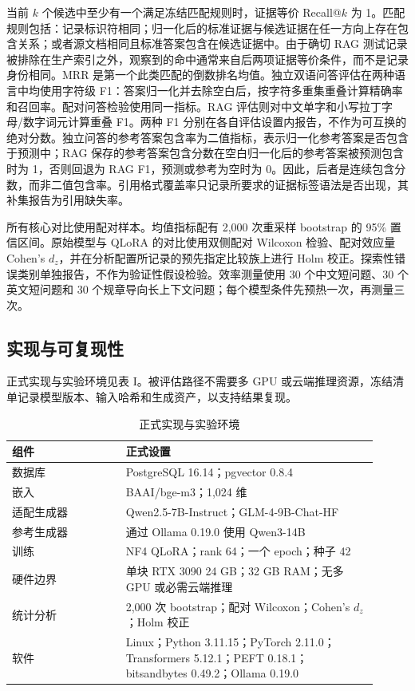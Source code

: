 当前 $k$ 个候选中至少有一个满足冻结匹配规则时，证据等价 Recall@$k$ 为 1。匹配规则包括：记录标识符相同；归一化后的标准证据与候选证据在任一方向上存在包含关系；或者源文档相同且标准答案包含在候选证据中。由于确切 RAG 测试记录被排除在生产索引之外，观察到的命中通常来自后两项证据等价条件，而不是记录身份相同。MRR 是第一个此类匹配的倒数排名均值。独立双语问答评估在两种语言中均使用字符级 F1：答案归一化并去除空白后，按字符多重集重叠计算精确率和召回率。配对问答检验使用同一指标。RAG 评估则对中文单字和小写拉丁字母/数字词元计算重叠 F1。两种 F1 分别在各自评估设置内报告，不作为可互换的绝对分数。独立问答的参考答案包含率为二值指标，表示归一化参考答案是否包含于预测中；RAG 保存的参考答案包含分数在空白归一化后的参考答案被预测包含时为 1，否则回退为 RAG F1，预测或参考为空时为 0。因此，后者是连续包含分数，而非二值包含率。引用格式覆盖率只记录所要求的证据标签语法是否出现，其补集报告为引用缺失率。

所有核心对比使用配对样本。均值指标配有 2,000 次重采样 bootstrap 的 95\% 置信区间。原始模型与 QLoRA 的对比使用双侧配对 Wilcoxon 检验、配对效应量 Cohen's $d_z$，并在分析配置所记录的预先指定比较族上进行 Holm 校正。探索性错误类别单独报告，不作为验证性假设检验。效率测量使用 30 个中文短问题、30 个英文短问题和 30 个规章导向长上下文问题；每个模型条件先预热一次，再测量三次。

\subsection{实现与可复现性}

正式实现与实验环境见表 I。被评估路径不需要多 GPU 或云端推理资源，冻结清单记录模型版本、输入哈希和生成资产，以支持结果复现。

\begin{table}[ht]
\centering
\caption{正式实现与实验环境}
\begin{tabular}{p{0.29\linewidth}p{0.62\linewidth}}
\toprule
组件 & 正式设置 \\
\midrule
数据库 & PostgreSQL 16.14；pgvector 0.8.4 \\
嵌入 & BAAI/bge-m3；1,024 维 \\
适配生成器 & Qwen2.5-7B-Instruct；GLM-4-9B-Chat-HF \\
参考生成器 & 通过 Ollama 0.19.0 使用 Qwen3-14B \\
训练 & NF4 QLoRA；rank 64；一个 epoch；种子 42 \\
硬件边界 & 单块 RTX 3090 24 GB；32 GB RAM；无多 GPU 或必需云端推理 \\
统计分析 & 2,000 次 bootstrap；配对 Wilcoxon；Cohen's $d_z$；Holm 校正 \\
软件 & Linux；Python 3.11.15；PyTorch 2.11.0；Transformers 5.12.1；PEFT 0.18.1；bitsandbytes 0.49.2；Ollama 0.19.0 \\
\bottomrule
\end{tabular}
\end{table}

